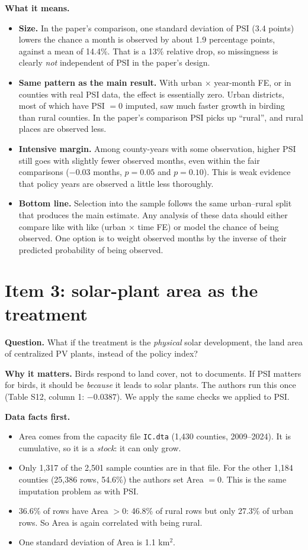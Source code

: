 \documentclass[11pt]{article}
\begin{document}
\textbf{What it means.}
\begin{itemize}[leftmargin=14pt,itemsep=1pt]
\item \textbf{Size.} In the paper's comparison, one standard deviation of PSI (3.4 points) lowers the chance a month is observed by about 1.9 percentage points, against a mean of 14.4\%. That is a 13\% relative drop, so missingness is clearly \emph{not} independent of PSI in the paper's design.
\item \textbf{Same pattern as the main result.} With urban $\times$ year-month FE, or in counties with real PSI data, the effect is essentially zero. Urban districts, most of which have PSI $=0$ imputed, saw much faster growth in birding than rural counties. In the paper's comparison PSI picks up ``rural'', and rural places are observed less.
\item \textbf{Intensive margin.} Among county-years with some observation, higher PSI still goes with slightly fewer observed months, even within the fair comparisons ($-0.03$ months, $p=0.05$ and $p=0.10$). This is weak evidence that policy years are observed a little less thoroughly.
\item \textbf{Bottom line.} Selection into the sample follows the same urban--rural split that produces the main estimate. Any analysis of these data should either compare like with like (urban $\times$ time FE) or model the chance of being observed. One option is to weight observed months by the inverse of their predicted probability of being observed.
\end{itemize}

\section{Item 3: solar-plant area as the treatment}
\textbf{Question.} What if the treatment is the \emph{physical} solar development, the land area of centralized PV plants, instead of the policy index?

\textbf{Why it matters.} Birds respond to land cover, not to documents. If PSI matters for birds, it should be \emph{because} it leads to solar plants. The authors run this once (Table S12, column 1: $-0.0387$). We apply the same checks we applied to PSI.

\textbf{Data facts first.}
\begin{itemize}[leftmargin=14pt,itemsep=1pt]
\item Area comes from the capacity file \texttt{IC.dta} (1,430 counties, 2009--2024). It is cumulative, so it is a \emph{stock}: it can only grow.
\item Only 1,317 of the 2,501 sample counties are in that file. For the other 1,184 counties (25,386 rows, 54.6\%) the authors set Area $=0$. This is the same imputation problem as with PSI.
\item 36.6\% of rows have Area $>0$: 46.8\% of rural rows but only 27.3\% of urban rows. So Area is again correlated with being rural.
\item One standard deviation of Area is 1.1 km$^2$.
\end{itemize}
\end{document}
